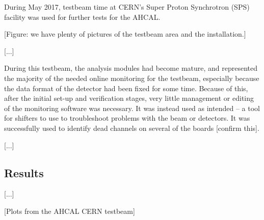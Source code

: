 During May 2017, testbeam time at CERN's Super Proton Synchrotron (SPS) facility was used for further tests for the AHCAL.

\begin{center}
	[Figure: we have plenty of pictures of the testbeam area and the installation.]
\end{center}

[...]

During this testbeam, the analysis modules had become mature, and represented the majority of the needed online monitoring for the testbeam, especially because the data format of the detector had been fixed for some time. Because of this, after the initial set-up and verification stages, very little management or editing of the monitoring software was necessary. It was instead used as intended -- a tool for shifters to use to troubleshoot problems with the beam or detectors. It was successfully used to identify dead channels on several of the boards [confirm this].

[...]

\subsection{Results}
[...]

\begin{center}
	[Plots from the AHCAL CERN testbeam]
\end{center}
